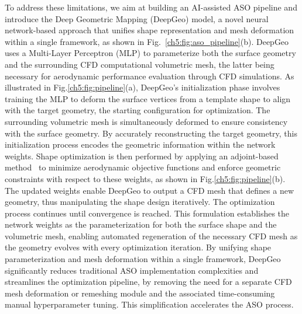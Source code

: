 To address these limitations, we aim at building an AI-assisted ASO pipeline and introduce the Deep Geometric Mapping (DeepGeo) model, a novel neural network-based approach that unifies shape representation and mesh deformation within a single framework, as shown in Fig.~\ref{ch5:fig:aso_pipeline}(b). DeepGeo uses a Multi-Layer Perceptron (MLP) to parameterize both the surface geometry and the surrounding CFD computational volumetric mesh, the latter being necessary for aerodynamic performance evaluation through CFD simulations. 
As illustrated in Fig.\ref{ch5:fig:pipeline}(a), DeepGeo's initialization phase involves training the MLP to deform the surface vertices from a template shape to align with the target geometry, the starting configuration for optimization.
The surrounding volumetric mesh is simultaneously deformed to ensure consistency with the surface geometry. By accurately reconstructing the target geometry, this initialization process encodes the geometric information within the network weights. 
Shape optimization is then performed by applying an adjoint-based method~\cite{aa.Jameson1995} to minimize aerodynamic objective functions and enforce geometric constraints with respect to these weights, as shown in Fig.\ref{ch5:fig:pipeline}(b). 
The updated weights enable DeepGeo to output a CFD mesh that defines a new geometry, thus manipulating the shape design iteratively. The optimization process continues until convergence is reached.
This formulation establishes the network weights as the parameterization for both the surface shape and the volumetric mesh, enabling automated regeneration of the necessary CFD mesh as the geometry evolves with every optimization iteration. By unifying shape parameterization and mesh deformation within a single framework, DeepGeo significantly reduces traditional ASO implementation complexities and streamlines the optimization pipeline, by removing the need for a separate CFD mesh deformation or remeshing module and the associated time-consuming manual hyperparameter tuning. This simplification accelerates the ASO process.





